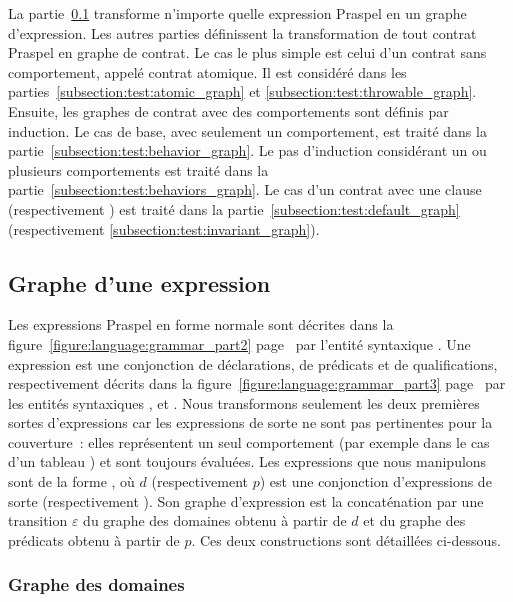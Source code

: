 La partie~\ref{subsection:test:expression_graph} transforme n'importe quelle
expression Praspel en un graphe d'expression. Les autres parties définissent la
transformation de tout contrat Praspel en graphe de contrat. Le cas le plus
simple est celui d'un contrat sans comportement, appelé {\strong contrat
atomique}. Il est considéré dans les parties~\ref{subsection:test:atomic_graph}
et \ref{subsection:test:throwable_graph}. Ensuite, les graphes de contrat avec
des comportements sont définis par induction. Le cas de base, avec seulement un
comportement, est traité dans la partie~\ref{subsection:test:behavior_graph}. Le
pas d'induction considérant un ou plusieurs comportements est traité dans la
partie~\ref{subsection:test:behaviors_graph}. Le cas d'un contrat avec une
clause \adefault (respectivement \ainvariant) est traité dans la
partie~\ref{subsection:test:default_graph} (respectivement
\ref{subsection:test:invariant_graph}).

\subsection{Graphe d'une expression}
\label{subsection:test:expression_graph}

Les expressions Praspel en forme normale sont décrites dans la
figure~\ref{figure:language:grammar_part2}
page~\pageref{figure:language:grammar_part2} par l'entité syntaxique
. Une expression est une conjonction de déclarations, de
prédicats et de qualifications, respectivement décrits dans la
figure~\ref{figure:language:grammar_part3}
page~\pageref{figure:language:grammar_part3} par les entités syntaxiques
,  et . Nous transformons
seulement les deux premières sortes d'expressions car les expressions de sorte
 ne sont pas pertinentes pour la couverture~: elles
représentent un seul comportement (par exemple  dans le cas
d'un tableau ) et sont toujours évaluées.
Les expressions que nous manipulons sont de la forme , où $d$ (respectivement $p$) est une conjonction d'expressions de sorte
 (respectivement ). Son graphe d'expression
est la concaténation par une transition $\varepsilon$ du {\strong graphe des
domaines} obtenu à partir de $d$ et du {\strong graphe des prédicats} obtenu à
partir de $p$. Ces deux constructions sont détaillées ci-dessous.

\subsubsection{Graphe des domaines}


